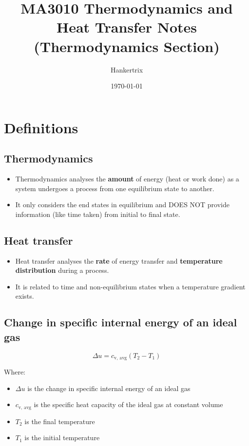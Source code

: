 \documentclass[11pt]{article}
\author{Hankertrix}
\date{\today}
\title{MA3010 Thermodynamics and Heat Transfer Notes (Thermodynamics Section)}
\begin{document}
\maketitle
\setcounter{tocdepth}{2}
\tableofcontents \clearpage\section{Definitions}
\label{sec:orga7cc834}

\subsection{Thermodynamics}
\label{sec:org4168ddc}
\begin{itemize}
\item Thermodynamics analyses the \textbf{amount} of energy (heat or work done) as a system undergoes a process from one equilibrium state to another.
\item It only considers the end states in equilibrium and DOES NOT provide information (like time taken) from initial to final state.
\end{itemize}
\subsection{Heat transfer}
\label{sec:org7150f0b}
\begin{itemize}
\item Heat transfer analyses the \textbf{rate} of energy transfer and \textbf{temperature distribution} during a process.
\item It is related to time and non-equilibrium states when a temperature gradient exists.
\end{itemize}
\subsection{Change in specific internal energy of an ideal gas}
\label{sec:org6d84a23}
\[\Delta u = c_{\text{v, avg}} (T_2 - T_1)\]

Where:
\begin{itemize}
\item \(\Delta u\) is the change in specific internal energy of an ideal gas
\item \(c_{\text{v, avg}}\) is the specific heat capacity of the ideal gas at constant volume
\item \(T_2\) is the final temperature
\item \(T_1\) is the initial temperature
\end{itemize}
\end{document}
